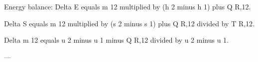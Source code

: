 Energy balance:  
Delta E equals m 12 multiplied by (h 2 minus h 1) plus Q R,12.  

Delta S equals m 12 multiplied by (s 2 minus s 1) plus Q R,12 divided by T R,12.  

Delta m 12 equals u 2 minus u 1 minus Q R,12 divided by u 2 minus u 1.  

---
